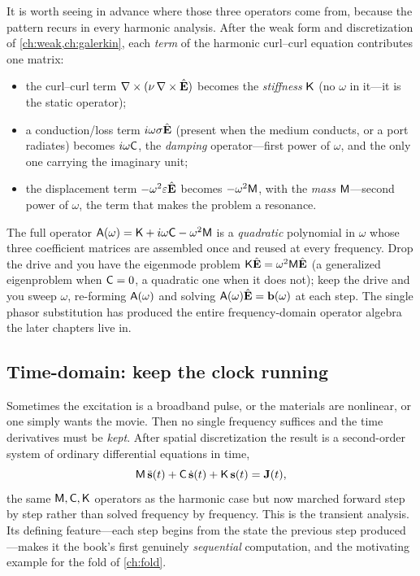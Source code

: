 It is worth seeing in advance where those three operators come from, because the
pattern recurs in every harmonic analysis. After the weak form and
discretization of \cref{ch:weak,ch:galerkin}, each \emph{term} of the harmonic
curl--curl equation contributes one matrix:
\begin{itemize}
  \item the curl--curl term $\nabla\times(\nu\,\nabla\times\hat{\mathbf{E}})$ becomes the
  \emph{stiffness} $\mathsf{K}$ (no $\omega$ in it---it is the static operator);
  \item a conduction/loss term $i\omega\sigma\hat{\mathbf{E}}$ (present when the medium
  conducts, or a port radiates) becomes $i\omega\mathsf{C}$, the \emph{damping}
  operator---first power of $\omega$, and the only one carrying the imaginary
  unit;
  \item the displacement term $-\omega^2\varepsilon\hat{\mathbf{E}}$ becomes
  $-\omega^2\mathsf{M}$, with the \emph{mass} $\mathsf{M}$---second power of $\omega$,
  the term that makes the problem a resonance.
\end{itemize}
The full operator $\mathsf{A}(\omega)=\mathsf{K} + i\omega\mathsf{C} - \omega^2\mathsf{M}$ is a
\emph{quadratic} polynomial in $\omega$ whose three coefficient matrices are
assembled once and reused at every frequency. Drop the drive and you have the
eigenmode problem $\mathsf{K}\hat{\mathbf{E}}=\omega^2\mathsf{M}\hat{\mathbf{E}}$ (a generalized
eigenproblem when $\mathsf{C}=0$, a quadratic one when it does not); keep the drive
and you sweep $\omega$, re-forming $\mathsf{A}(\omega)$ and solving
$\mathsf{A}(\omega)\hat{\mathbf{E}}=\mathbf{b}(\omega)$ at each step. The single phasor
substitution has produced the entire frequency-domain operator algebra the
later chapters live in.

\subsection{Time-domain: keep the clock running}

Sometimes the excitation is a broadband pulse, or the materials are nonlinear,
or one simply wants the movie. Then no single frequency suffices and the time
derivatives must be \emph{kept}. After spatial discretization the result is a
second-order system of ordinary differential equations in time,
\[
  \mathsf{M}\,\ddot{\mathbf{s}}(t) + \mathsf{C}\,\dot{\mathbf{s}}(t) + \mathsf{K}\,\mathbf{s}(t) = \mathbf{J}(t),
\]
the same $\mathsf{M},\mathsf{C},\mathsf{K}$ operators as the harmonic case but now marched
forward step by step rather than solved frequency by frequency. This is the
transient analysis. Its defining feature---each step begins from the state the
previous step produced---makes it the book's first genuinely \emph{sequential}
computation, and the motivating example for the fold of \cref{ch:fold}.

